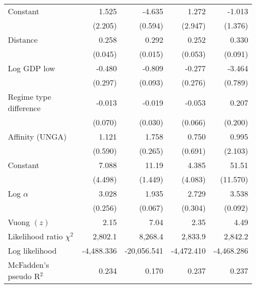 \begin{table}[htbp]
\begin{tabular}{l*{4}{D{.}{.}{-1}}}
\addlinespace
Constant&       1.525         &      -4.635\sym{***}&       1.272         &      -1.013         \\
   &     (2.205)         &     (0.594)         &     (2.947)         &     (1.376)         \\
\midrule
Distance&       0.258\sym{***}&       0.292\sym{***}&       0.252\sym{***}&       0.330\sym{***}\\
   &     (0.045)         &     (0.015)         &     (0.053)         &     (0.091)         \\
\addlinespace
Log GDP low&      -0.480         &      -0.809\sym{***}&      -0.277         &      -3.464\sym{***}\\
   &     (0.297)         &     (0.093)         &     (0.276)         &     (0.789)         \\
\addlinespace
Regime type difference&     -0.013         &     -0.019         &     -0.053         &       0.207         \\
   &     (0.070)         &     (0.030)         &     (0.066)         &     (0.200)         \\
\addlinespace
Affinity (UNGA)&       1.121\sym{+}  &       1.758\sym{***}&       0.750         &       0.995         \\
   &     (0.590)         &     (0.265)         &     (0.691)         &     (2.103)         \\
\addlinespace
Constant&       7.088         &       11.19\sym{***}&       4.385         &       51.51\sym{***}\\
   &     (4.498)         &     (1.449)         &     (4.083)         &    (11.570)         \\
\midrule
Log $\alpha$&       3.028\sym{***}&       1.935\sym{***}&       2.729\sym{***}&       3.538\sym{***}\\
   &     (0.256)         &     (0.067)         &     (0.304)         &     (0.092)         \\
Vuong $(z)$&         2.15             &            7.04          &         2.35            &           4.49          \\
Likelihood ratio $\chi^{2}$&      2,802.1\sym{***}         &      8,268.4\sym{***}         &      2,833.9\sym{***}         &      2,842.2\sym{***}         \\
Log likelihood&          -4,488.336           &        -20,056.541             &            -4,472.410         &            -4,468.286          \\
McFadden's pseudo R$^{2}$&       0.234              &      0.170                &     0.237                &    0.237                  \\

\end{tabular}
\end{table}
